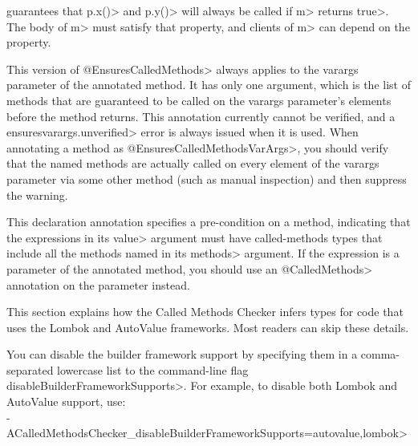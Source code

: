 \begin{description}
  guarantees that \<p.x()> and \<p.y()> will always be called if \<m> returns \<true>.
  The body of \<m> must satisfy that property, and clients of \<m> can depend on the property.

\item[\refqualclass{checker/calledmethods/qual}{EnsuresCalledMethodsVarArgs}]
  This version of \<@EnsuresCalledMethods> always applies to the varargs parameter of the
  annotated method. It has only one argument, which is the list of methods that are guaranteed
  to be called on the varargs parameter's elements before the method returns. This annotation
  currently cannot be verified, and a \<ensuresvarargs.unverified> error is always issued
  when it is used. When annotating a method as \<@EnsuresCalledMethodsVarArgs>, you should verify
  that the named methods are actually called on every element of the varargs parameter via some
  other method (such as manual inspection) and then suppress the warning.

\item[\refqualclass{checker/calledmethods/qual}{RequiresCalledMethods}]
  This declaration annotation specifies a pre-condition on a method, indicating that the expressions
  in its \<value> argument must have called-methods types that include all the methods named
  in its \<methods> argument. If the expression is a parameter of the annotated method, you should
  use an \<@CalledMethods> annotation on the parameter instead.

\end{description}


This section explains how the Called Methods Checker infers types for code
that uses the Lombok and AutoValue frameworks. Most readers can skip these
details.

You can disable the builder framework support by specifying them in a
comma-separated lowercase list to the command-line flag
\<disableBuilderFrameworkSupports>.  For example, to disable both Lombok
and AutoValue support, use: \\
\<-ACalledMethodsChecker\_disableBuilderFrameworkSupports=autovalue,lombok>

